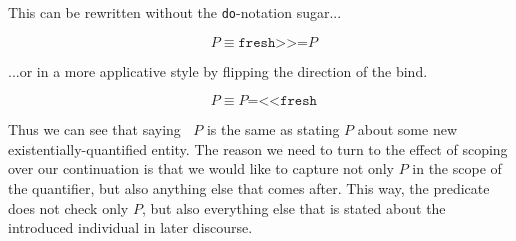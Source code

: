 \documentclass{article}
\newcommand{\dexists}{\mathop{\bar{\exists}}}
\newcommand{\hsbind}{\mathbin{\texttt{>>=}}}
\newcommand{\hsrevbind}{\mathbin{\texttt{=<<}}}
\begin{document}
This can be rewritten without the \texttt{do}-notation sugar...

$$
\dexists P \equiv \texttt{fresh} \hsbind P
$$

...or in a more applicative style by flipping the direction of the bind.

$$
\dexists P \equiv P \hsrevbind \texttt{fresh}
$$

Thus we can see that saying $\dexists P$ is the same as stating $P$ about some
new existentially-quantified entity. The reason we need to turn to the effect
of scoping over our continuation is that we would like to capture not only $P$
in the scope of the quantifier, but also anything else that comes after. This
way, the predicate does not check only $P$, but also everything else that is
stated about the introduced individual in later discourse.

\end{document}
